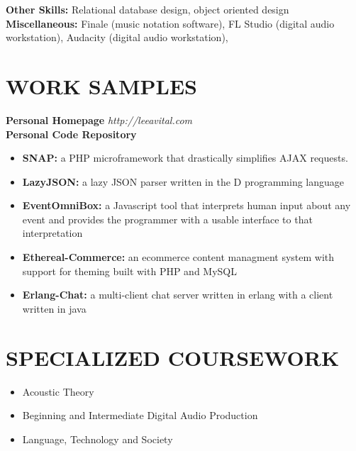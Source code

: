 \documentclass[line,margin]{res}
\begin{document}
\begin{resume}
\begin{tabbing}
	{\bf Other Skills:} \> Relational database design, object oriented design \\
	
	{\bf Miscellaneous: } \> Finale (music notation software), FL Studio (digital audio \\ 
				 \>workstation),  Audacity (digital audio workstation), 
	\end{tabbing}
	
 
\section{WORK SAMPLES} 
\vspace{-2ex}
\begin{tabbing}
{\bf Personal Homepage} \hspace{.5in}   \= {\sl http://leeavital.com } \\
{\bf Personal Code Repository}	
\end{tabbing}
  \begin{itemize}  \itemsep -2pt %
\item {\bf SNAP:} a PHP microframework that drastically simplifies AJAX requests.
\item {\bf LazyJSON:} a lazy JSON parser written in the D programming language
\item {\bf EventOmniBox:} a Javascript tool that interprets human input about any event and provides the programmer with a usable interface to that interpretation
\item {\bf Ethereal-Commerce:} an ecommerce content managment system with support for theming built with PHP and MySQL
\item {\bf Erlang-Chat: } a multi-client chat server written in erlang with a client written in java
\end{itemize}



\section{SPECIALIZED COURSEWORK}
\begin{itemize} \itemsep -2pt
\item Acoustic Theory
\item Beginning and Intermediate Digital Audio Production 
\item Language, Technology and Society
\end{itemize}
 

\end{resume}
\end{document}
